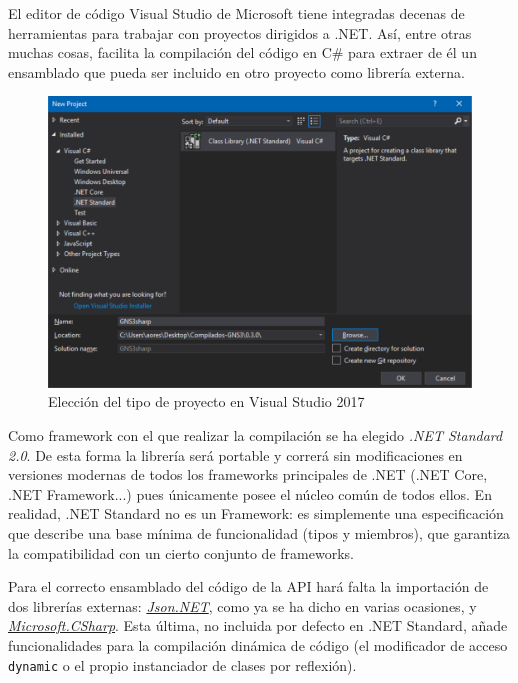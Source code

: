 El editor de código Visual Studio de Microsoft tiene integradas decenas de herramientas para trabajar con proyectos dirigidos a .NET. Así, entre otras muchas cosas, facilita la compilación del código en C\# para extraer de él un ensamblado que pueda ser incluido en otro proyecto como librería externa.

\begin{figure}[h]
  \centering
  \includegraphics[scale=0.225]{imagenes/creacion_ensamblado}
  \caption{Elección del tipo de proyecto en Visual Studio 2017}
  \label{fig:creacion_ensamblado}
\end{figure}

Como framework con el que realizar la compilación se ha elegido \textit{.NET Standard 2.0}. De esta forma la librería será portable y correrá sin modificaciones en versiones modernas de todos los frameworks principales de .NET (.NET Core, .NET Framework...) pues únicamente posee el núcleo común de todos ellos. En realidad, .NET Standard no es un Framework: es simplemente una especificación que describe una base mínima de funcionalidad (tipos y miembros), que garantiza la compatibilidad con un cierto conjunto de frameworks.

Para el correcto ensamblado del código de la API hará falta la importación de dos librerías externas: \href{https://www.nuget.org/packages/Newtonsoft.Json/}{\textit{Json.NET}}, como ya se ha dicho en varias ocasiones, y \href{https://www.nuget.org/packages/Microsoft.CSharp/}{\textit{Microsoft.CSharp}}. Esta última, no incluida por defecto en .NET Standard, añade funcionalidades para la compilación dinámica de código (el modificador de acceso \texttt{dynamic} o el propio instanciador de clases por reflexión).

